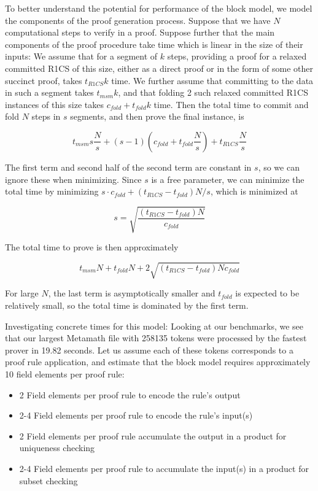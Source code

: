 \documentclass{article}
\theoremstyle{plain}
\theoremstyle{definition}
\begin{document}
To better understand the potential for performance of the block model, we model the components of the proof generation process. Suppose that we have $N$ computational steps to verify in a proof. Suppose further that the main components of the proof procedure take time which is linear in the size of their inputs: We assume that for a segment of $k$ steps, providing a proof for a relaxed committed R1CS of this size, either as a direct proof or in the form of some other succinct proof, takes $t_{R1CS} k$ time. We further assume that committing to the data in such a segment takes $t_{msm} k$, and that folding 2 such relaxed committed R1CS instances of this size takes $c_{fold} + t_{fold} k$ time. Then the total time to commit and fold $N$ steps in $s$ segments, and then prove the final instance, is

\[
t_{msm} s \frac{N}{s}  + (s-1) (c_{fold} + t_{fold} \frac{N}{s}) + t_{R1CS} \frac{N}{s}
\]

The first term and second half of the second term are constant in $s$, so we can ignore these when minimizing. Since $s$ is a free parameter, we can minimize the total time by minimizing $s \cdot c_{fold} + (t_{R1CS} - t_{fold}) N/s$, which is minimized at 

\[
s = \sqrt{\frac{(t_{R1CS} - t_{fold}) N}{c_{fold}}}
\]

The total time to prove is then approximately

\[
    t_{msm} N + t_{fold} N + 2 \sqrt{(t_{R1CS} - t_{fold}) N c_{fold}} 
\]

For large $N$, the last term is asymptotically smaller and $t_{fold}$ is expected to be relatively small, so the total time is dominated by the first term.


Investigating concrete times for this model: Looking at our benchmarks, we see that our largest Metamath file with 258135 tokens were processed by the fastest prover in 19.82 seconds. Let us assume each of these tokens corresponds to a proof rule application, and estimate that the block model requires approximately 10 field elements per proof rule:

\begin{itemize}
\item 2 Field elements per proof rule to encode the rule's output
\item 2-4 Field elements per proof rule to encode the rule's input(s)
\item 2 Field elements per proof rule accumulate the output in a product for uniqueness checking
\item 2-4 Field elements per proof rule to accumulate the input(s) in a product for subset checking
\end{itemize}
\end{document}
